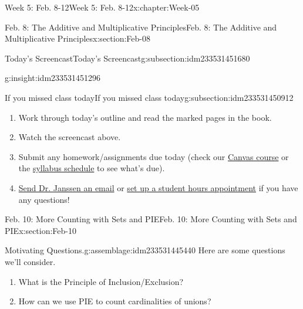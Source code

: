 \documentclass[oneside,10pt,]{book}
\numberwithin{equation}{section}
\begin{document}
\begin{chapterptx}{Week 5: Feb. 8-12}{}{Week 5: Feb. 8-12}{}{}{x:chapter:Week-05}
\begin{sectionptx}{Feb. 8: The Additive and Multiplicative Principles}{}{Feb. 8: The Additive and Multiplicative Principles}{}{}{x:section:Feb-08}
\begin{subsectionptx}{Today's Screencast}{}{Today's Screencast}{}{}{g:subsection:idm233531451680}
\begin{insight}{}{g:insight:idm233531451296}
\begin{tcbraster}[raster columns=2, raster column skip=1pt, raster halign=center, raster force size=false, raster left skip=0pt, raster right skip=0pt]
\begin{tcolorbox}[qrstyle]
[QR LINK]\end{tcolorbox}%
\end{tcbraster}%
\end{insight}
\end{subsectionptx}
%
%
\typeout{************************************************}
\typeout{************************************************}
%
\begin{subsectionptx}{If you missed class today}{}{If you missed class today}{}{}{g:subsection:idm233531450912}
%
\begin{enumerate}
\item{}Work through today's outline and read the marked pages in the book.%
\item{}Watch the screencast above.%
\item{}Submit any homework\slash{}assignments due today (check our \href{https://dordt.instructure.com/courses/3110050}{Canvas course} or the \href{https://prof.mkjanssen.org/ds/index.html\#schedule}{syllabus schedule} to see what's due).%
\item{}\href{mailto:mike.janssen@dordt.edu}{Send Dr. Janssen an email} or \href{https://calendly.com/mkjanssen/student-hours}{set up a student hours appointment} if you have any questions!%
\end{enumerate}
\end{subsectionptx}
\end{sectionptx}
%
%
\typeout{************************************************}
\typeout{************************************************}
%
\begin{sectionptx}{Feb. 10: More Counting with Sets and PIE}{}{Feb. 10: More Counting with Sets and PIE}{}{}{x:section:Feb-10}
\begin{introduction}{}%
\begin{assemblage}{Motivating Questions.}{g:assemblage:idm233531445440}%
Here are some questions we'll consider. %
\begin{enumerate}
\item{}What is the Principle of Inclusion\slash{}Exclusion?%
\item{}How can we use PIE to count cardinalities of unions?%
\end{enumerate}
%
\end{assemblage}
\end{introduction}%
%
%
\typeout{************************************************}

\end{sectionptx}
\end{chapterptx}
\end{document}
